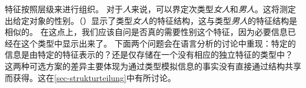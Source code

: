 特征按照层级来进行组织。
对于\textit{人}来说，可以界定次类型\textit{女人}和\textit{男人}。这将测定出给定对象的性别。（）显示了类型\textit{女人}的特征结构，这与类型\textit{男人}的特征结构是相似的。
\ea
{}
\z
在这点上，我们应该自问是否真的需要\textsc{性别}这个特征，因为必要信息已经在这个类型中显示出来了。
下面两个问题会在语言分析的讨论中重现：特定的信息是由特定的特征表示的？还是仅存储在一个没有相应的独立特征的类型中？
这两种可选方案的差异主要体现为通过类型模拟信息的事实没有直接通过结构共享而获得。这在\ref{sec-strukturteilung}中有所讨论。

